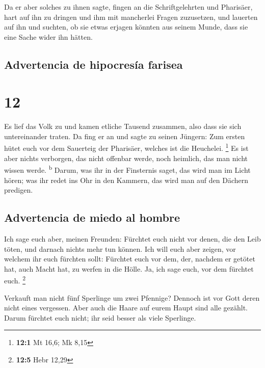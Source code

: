 Da er aber solches zu ihnen sagte, fingen an die
Schriftgelehrten und Pharisäer, hart auf ihn zu dringen und ihm mit
mancherlei Fragen zuzusetzen,  und lauerten auf ihn und
suchten, ob sie etwas erjagen könnten aus seinem Munde, dass sie eine
Sache wider ihn hätten.

\hypertarget{advertencia-de-hipocresuxeda-farisea}{%
\subsection{Advertencia de hipocresía
farisea}\label{advertencia-de-hipocresuxeda-farisea}}

\hypertarget{section-11}{%
\section{12}\label{section-11}}

 Es lief das Volk zu und kamen etliche Tausend zusammen,
also dass sie sich untereinander traten. Da fing er an und sagte zu
seinen Jüngern: Zum ersten hütet euch vor dem Sauerteig der Pharisäer,
welches ist die Heuchelei. \footnote{\textbf{12:1} Mt 16,6; Mk 8,15}
 Es ist aber nichts verborgen, das nicht offenbar werde,
noch heimlich, das man nicht wissen werde. \textsuperscript{b}
 Darum, was ihr in der Finsternis saget, das wird man im
Licht hören; was ihr redet ins Ohr in den Kammern, das wird man auf den
Dächern predigen.

\hypertarget{advertencia-de-miedo-al-hombre}{%
\subsection{Advertencia de miedo al
hombre}\label{advertencia-de-miedo-al-hombre}}

 Ich sage euch aber, meinen Freunden: Fürchtet euch nicht
vor denen, die den Leib töten, und darnach nichts mehr tun können.
 Ich will euch aber zeigen, vor welchem ihr euch fürchten
sollt: Fürchtet euch vor dem, der, nachdem er getötet hat, auch Macht
hat, zu werfen in die Hölle. Ja, ich sage euch, vor dem fürchtet euch.
\footnote{\textbf{12:5} Hebr 12,29}

 Verkauft man nicht fünf Sperlinge um zwei Pfennige?
Dennoch ist vor Gott deren nicht eines vergessen.  Aber
auch die Haare auf eurem Haupt sind alle gezählt. Darum fürchtet euch
nicht; ihr seid besser als viele Sperlinge.

